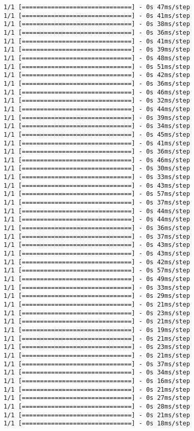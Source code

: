 \documentclass[11pt]{article}
\begin{document}
\begin{Verbatim}[commandchars=\\\{\}]
1/1 [==============================] - 0s 47ms/step
1/1 [==============================] - 0s 41ms/step
1/1 [==============================] - 0s 38ms/step
1/1 [==============================] - 0s 36ms/step
1/1 [==============================] - 0s 41ms/step
1/1 [==============================] - 0s 39ms/step
1/1 [==============================] - 0s 48ms/step
1/1 [==============================] - 0s 51ms/step
1/1 [==============================] - 0s 42ms/step
1/1 [==============================] - 0s 36ms/step
1/1 [==============================] - 0s 46ms/step
1/1 [==============================] - 0s 32ms/step
1/1 [==============================] - 0s 44ms/step
1/1 [==============================] - 0s 39ms/step
1/1 [==============================] - 0s 34ms/step
1/1 [==============================] - 0s 45ms/step
1/1 [==============================] - 0s 41ms/step
1/1 [==============================] - 0s 36ms/step
1/1 [==============================] - 0s 46ms/step
1/1 [==============================] - 0s 30ms/step
1/1 [==============================] - 0s 33ms/step
1/1 [==============================] - 0s 43ms/step
1/1 [==============================] - 0s 57ms/step
1/1 [==============================] - 0s 37ms/step
1/1 [==============================] - 0s 44ms/step
1/1 [==============================] - 0s 44ms/step
1/1 [==============================] - 0s 36ms/step
1/1 [==============================] - 0s 37ms/step
1/1 [==============================] - 0s 43ms/step
1/1 [==============================] - 0s 43ms/step
1/1 [==============================] - 0s 42ms/step
1/1 [==============================] - 0s 57ms/step
1/1 [==============================] - 0s 49ms/step
1/1 [==============================] - 0s 33ms/step
1/1 [==============================] - 0s 29ms/step
1/1 [==============================] - 0s 21ms/step
1/1 [==============================] - 0s 23ms/step
1/1 [==============================] - 0s 21ms/step
1/1 [==============================] - 0s 19ms/step
1/1 [==============================] - 0s 21ms/step
1/1 [==============================] - 0s 23ms/step
1/1 [==============================] - 0s 21ms/step
1/1 [==============================] - 0s 37ms/step
1/1 [==============================] - 0s 34ms/step
1/1 [==============================] - 0s 16ms/step
1/1 [==============================] - 0s 21ms/step
1/1 [==============================] - 0s 27ms/step
1/1 [==============================] - 0s 28ms/step
1/1 [==============================] - 0s 21ms/step
1/1 [==============================] - 0s 18ms/step

\end{Verbatim}
\end{document}
